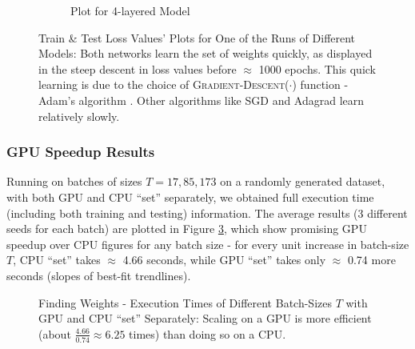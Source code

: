 \documentclass[12pt]{article}
\begin{document}
\begin{figure}[!htbp]
\begin{subfigure}{.49\textwidth}
            \caption{Plot for 4-layered Model}
            \label{fig:Plot for 4-layered Model}
        \end{subfigure}
        \caption[Train \& Test Loss Values' Plots for One of the Runs of Different Models]{Train \& Test Loss Values' Plots for One of the Runs of Different Models: Both networks learn the set of weights quickly, as displayed in the steep descent in loss values before $\approx$ 1000 epochs. This quick learning is due to the choice of \textsc{Gradient-Descent}($\cdot$) function - Adam's algorithm \cite{Adam}. Other algorithms like SGD \cite{SGD} and Adagrad \cite{Adagrad} learn relatively slowly.}
        \label{fig:Train & Test Loss Values' Plots of Different Models}
    \end{figure}

    \subsubsection{GPU Speedup Results} \label{sec:IdProbRes - GPU}
    Running on batches of sizes $T = 17, 85, 173$ on a randomly generated dataset, with both GPU and CPU ``set'' separately, we obtained full  execution time (including both training and testing) information. The average results (3 different seeds for each batch) are plotted in Figure \ref{fig:Execution Times of Different Batch-Sizes with GPU and CPU ``set'' Separately}, which show promising GPU speedup over CPU figures for any batch size - for every unit increase in batch-size $T$, CPU ``set'' takes $\approx$ 4.66 seconds, while GPU ``set'' takes only $\approx$ 0.74 more seconds (slopes of best-fit trendlines).
    \begin{figure}[!htbp]
        \centering
        \caption[Finding Weights - Execution Times of Different Batch-Sizes $T$ with GPU and CPU ``set'' Separately]{Finding Weights - Execution Times of Different Batch-Sizes $T$ with GPU and CPU ``set'' Separately: Scaling on a GPU is more efficient (about $\frac{4.66}{0.74} \approx 6.25$ times) than doing so on a CPU.}
        \label{fig:Execution Times of Different Batch-Sizes with GPU and CPU ``set'' Separately}
    \end{figure}
\end{document}
